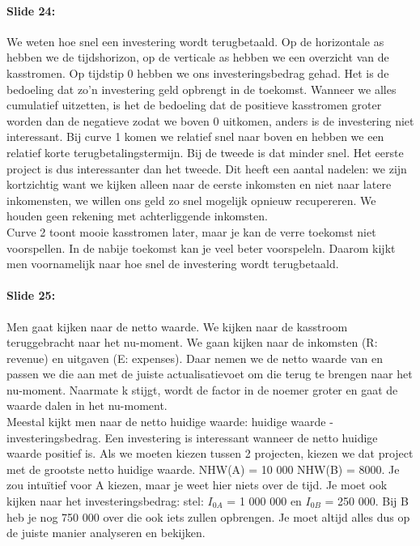 \documentclass[10pt,a4paper]{report}
\begin{document}
\paragraph{Slide 24:} We weten hoe snel een investering wordt terugbetaald. Op de horizontale as hebben we de tijdshorizon, op de verticale as hebben we een overzicht van de kasstromen. Op tijdstip 0 hebben we ons investeringsbedrag gehad. Het is de bedoeling dat zo'n investering geld opbrengt in de toekomst. Wanneer we alles cumulatief uitzetten, is het de bedoeling dat de positieve kasstromen groter worden dan de negatieve zodat we boven 0 uitkomen, anders is de investering niet interessant. Bij curve 1 komen we relatief snel naar boven en hebben we een relatief korte terugbetalingstermijn. Bij de tweede is dat minder snel. Het eerste project is dus interessanter dan het tweede. Dit heeft een aantal nadelen: we zijn kortzichtig want we kijken alleen naar de eerste inkomsten en niet naar latere inkomensten, we willen ons geld zo snel mogelijk opnieuw recupereren. We houden geen rekening met achterliggende inkomsten.\\
Curve 2 toont mooie kasstromen later, maar je kan de verre toekomst niet voorspellen. In de nabije toekomst kan je veel beter voorspeleln. Daarom kijkt men voornamelijk naar hoe snel de investering wordt terugbetaald.

\paragraph{Slide 25:} Men gaat kijken naar de netto waarde. We kijken naar de kasstroom teruggebracht naar het nu-moment. We gaan kijken naar de inkomsten (R: revenue) en uitgaven (E: expenses). Daar nemen we de netto waarde van en passen we die aan met de juiste actualisatievoet om die terug te brengen naar het nu-moment. Naarmate k stijgt, wordt de factor in de noemer groter en gaat de waarde dalen in het nu-moment.\\
Meestal kijkt men naar de netto huidige waarde: huidige waarde - investeringsbedrag. Een investering is interessant wanneer de netto huidige waarde positief is. Als we moeten kiezen tussen 2 projecten, kiezen we dat project met de grootste netto huidige waarde. NHW(A) = 10 000 NHW(B) = 8000. Je zou intu\"itief voor A kiezen, maar je weet hier niets over de tijd. Je moet ook kijken naar het investeringsbedrag: stel: $I_{0A}$ = 1 000 000 en $I_{0B}$ = 250 000. Bij B heb je nog 750 000 over die ook iets zullen opbrengen. Je moet altijd alles dus op de juiste manier analyseren en bekijken.
\end{document}
